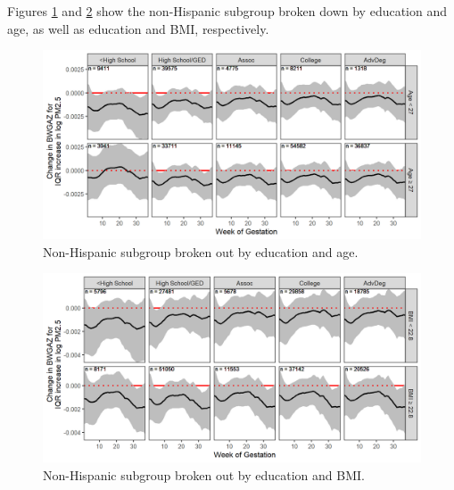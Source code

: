 \documentclass[12pt]{article}
\begin{document}
Figures \ref{fig:nonhisp-educ-age} and \ref{fig:nonhisp-educ-bmi} show the non-Hispanic subgroup broken down by education and age, as well as education and BMI, respectively.
\begin{figure}[!ht]
    \centering
    \includegraphics[width=.9\textwidth]{supp-img/nonhisp_educ_age.png}
    \caption{Non-Hispanic subgroup broken out by education and age.}
    \label{fig:nonhisp-educ-age}
\end{figure}
\begin{figure}[!ht]
    \centering
    \includegraphics[width=.9\textwidth]{supp-img/nonhisp_educ_bmi.png}
    \caption{Non-Hispanic subgroup broken out by education and BMI.}
    \label{fig:nonhisp-educ-bmi}
\end{figure}
\end{document}
